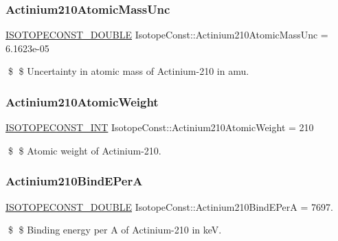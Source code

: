 \subsubsection{\texorpdfstring{Actinium210\+Atomic\+Mass\+Unc}{Actinium210AtomicMassUnc}}
{\footnotesize\ttfamily \mbox{\hyperlink{group___isotope_const-_macros_ga8f45a7272ce02c0b4c65c44636ed719a}{I\+S\+O\+T\+O\+P\+E\+C\+O\+N\+S\+T\+\_\+\+D\+O\+U\+B\+LE}} Isotope\+Const\+::\+Actinium210\+Atomic\+Mass\+Unc = 6.\+1623e-\/05}

\$ \$ Uncertainty in atomic mass of Actinium-\/210 in amu. \mbox{\label{group___isotope_const-_actinium-_ac210_ga23d0f0da03fd7d28b7c52b698dc4f3b2}} 
\subsubsection{\texorpdfstring{Actinium210\+Atomic\+Weight}{Actinium210AtomicWeight}}
{\footnotesize\ttfamily \mbox{\hyperlink{group___isotope_const-_macros_ga5f18360b3e99483a35c32d789e62621c}{I\+S\+O\+T\+O\+P\+E\+C\+O\+N\+S\+T\+\_\+\+I\+NT}} Isotope\+Const\+::\+Actinium210\+Atomic\+Weight = 210}

\$ \$ Atomic weight of Actinium-\/210. \mbox{\label{group___isotope_const-_actinium-_ac210_ga50de9c5eda51060ca27243a2d8de9712}} 
\subsubsection{\texorpdfstring{Actinium210\+Bind\+E\+PerA}{Actinium210BindEPerA}}
{\footnotesize\ttfamily \mbox{\hyperlink{group___isotope_const-_macros_ga8f45a7272ce02c0b4c65c44636ed719a}{I\+S\+O\+T\+O\+P\+E\+C\+O\+N\+S\+T\+\_\+\+D\+O\+U\+B\+LE}} Isotope\+Const\+::\+Actinium210\+Bind\+E\+PerA = 7697.}

\$ \$ Binding energy per A of Actinium-\/210 in keV. \mbox{\label{group___isotope_const-_actinium-_ac210_ga94e6e0292e91550454c8653379c2b3e7}} 
